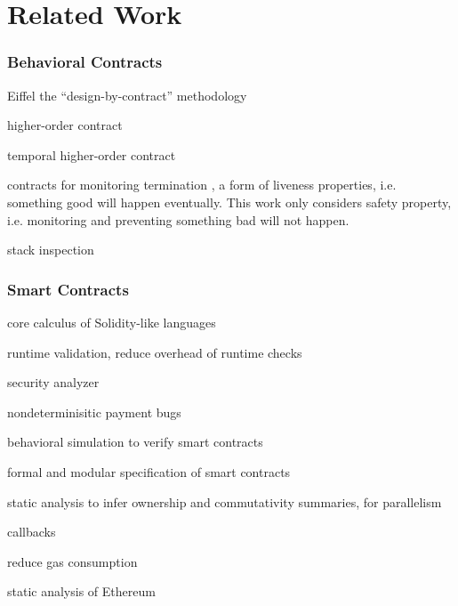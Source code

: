 \documentclass[acmsmall,review,anonymous]{acmart}\settopmatter{printfolios=true,printccs=false,printacmref=false}
\begin{document}
\section{Related Work}

\subsubsection*{\textbf{Behavioral Contracts}}

Eiffel the ``design-by-contract'' methodology \cite{DBLP:books/ph/Meyer91, DBLP:conf/tools/Meyer98a}

higher-order contract \cite{DBLP:conf/icfp/FindlerF02}

temporal higher-order contract \cite{DBLP:conf/icfp/DisneyFM11}

contracts for monitoring termination \cite{DBLP:conf/pldi/NguyenGTH19}, a form
of liveness properties, i.e.
something good will happen eventually.
This work only considers safety property, i.e. monitoring and preventing
something bad will not happen.

stack inspection \cite{DBLP:conf/popl/FournetG02, DBLP:conf/sp/WallachF98}

\subsubsection*{\textbf{Smart Contracts}}

core calculus of Solidity-like languages \cite{Sergey2021, DBLP:conf/esorics/BartolettiGM19, DBLP:conf/fc/CrafaPZ19}

runtime validation, reduce overhead of runtime checks \cite{DBLP:conf/pldi/LiCL20}

security analyzer \cite{DBLP:conf/pldi/BrentGLSS20}

nondeterminisitic payment bugs \cite{DBLP:journals/pacmpl/WangZS19}

behavioral simulation to verify smart contracts \cite{DBLP:conf/pldi/BeillahiCEE20}

formal and modular specification of smart contracts \cite{DBLP:journals/pacmpl/BramEMSS21}

static analysis to infer ownership and commutativity summaries, for parallelism
\cite{DBLP:conf/pldi/Pirlea0S21}

callbacks \cite{DBLP:journals/pacmpl/AlbertGRRRS20, DBLP:journals/pacmpl/GrossmanAGMRSZ18}

reduce gas consumption \cite{DBLP:journals/pacmpl/GrechKJBSS18}

static analysis of Ethereum \cite{DBLP:journals/pacmpl/SmaragdakisGLTT21}
\end{document}

